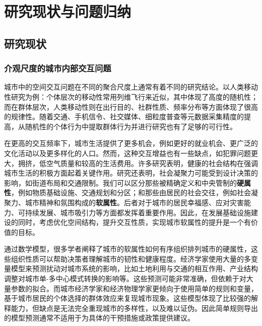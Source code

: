 \chapter{研究现状与问题归纳}

\section{研究现状}

\subsection{介观尺度的城市内部交互问题}

城市中的空间交互问题在不同的聚合尺度上通常有着不同的研究结论。以人类移动性研究为例：个体层次的移动性常用列维飞行来近似\cite{brockmann2006scaling,gonzalez2008understanding,mantegna1994stochastic,metzler2007some}，其中体现了高度的随机性；而在群体层次，人类移动性则在出行目的、社群性质、频率分布等方面体现了很高的规律性\cite{peng2012collective, jiang2017collective, dong2020spectral, wachowicz2016finding}。随着交通、手机信令、社交媒体、细粒度普查等元数据采集精度的提高，从随机性的个体行为中提取群体行为并进行研究也有了足够的可行性。

在更高的交互频率下，城市生活提供了更多机会，例如更好的就业机会、更广泛的文化活动以及更多样化的人口。然而，这种交互增益也有一些缺点，如犯罪问题更大，拥挤，低空气质量和较高的生活费用。许多研究表明，健康的社会结构在强调城市生活的积极方面起着关键作用。研究还表明，社会凝聚力可能受到设计决策的影响，如街道布局和交通限制\cite{appleyard1976liveable, appleyard1980livable}。我们可以区分那些被精确定义和中央管制的\textbf{硬属性}，例如物质基础设施、交通规划和分区；和那些由居民的社会交往，例如社会凝聚力、城市精神和氛围构成的\textbf{软属性}。后者对于城市的居民幸福感、应对灾害能力、可持续发展、城市吸引力等方面都发挥着重要作用。因此，在发展基础设施建设的同时，考虑优化空间结构，提升交互性质，实现城市软属性的提升是一个有价值的目标。

通过数学模型，很多学者阐释了城市的软属性如何有序组织排列城市的硬属性，这些组织性质可以帮助决策者理解城市的韧性和健康程度\cite{batty1971modelling, louf2013modeling}。经济学家使用大量的多变量模型来预测扰动对城市系统的影响，比如土地利用与交通的相互作用、产业结构调整对城市单-多中心模式转换的影响等\cite{fujita1982multiple, acheampong2015land}。这些预测可能非常准确，但依赖于对大量参数的拟合。而城市经济学家和经济物理学家更倾向于使用简单的规则和变量，基于城市居民的个体选择的群体效应来复现城市现象。这些模型体现了比较强的解释能力，但缺点是无法完全重现城市的多样性，以及难以证伪。因此简单规则导出的模型预测通常不适用于为具体的干预措施或政策提供建议。

